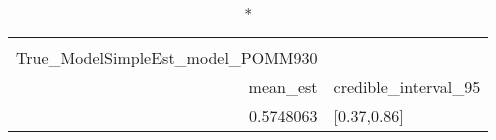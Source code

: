 \begin{longtable}{rl}
\caption*{
{\large Ssummarytable} \\ 
{\small True\_ModelSimpleEst\_model\_POMM930}
} \\ 
\toprule
mean\_est & credible\_interval\_95 \\ 
\midrule
0.5748063 & [0.37,0.86] \\ 
\bottomrule
\end{longtable}

